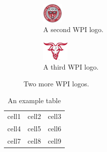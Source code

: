\begin{figure}[t!]
    \centering
    \begin{subfigure}[t]{0.5\textwidth}
        \centering
        \includegraphics[height=1cm]{header/executivesummary/wpi2.png}
        \caption{A second WPI logo.}
        \label{fig:wpi23a}
    \end{subfigure}%
    \begin{subfigure}[t]{0.5\textwidth}
        \centering
        \includegraphics[height=1cm]{header/executivesummary/wpi3.jpg}
        \caption{A third WPI logo.}
        \label{fig:wpi23b}
    \end{subfigure}
    \caption{Two more WPI logos.}
    \label{fig:wpi23}
\end{figure}

\begin{table}
    \centering
    \begin{tabular}{ |c|c|c| }
        \hline
        cell1 & cell2 & cell3 \\ 
        cell4 & cell5 & cell6 \\ 
        cell7 & cell8 & cell9 \\ 
        \hline
    \end{tabular}
    \caption{An example table}
    \label{tab:1}
\end{table}


